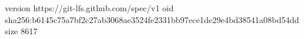 version https://git-lfs.github.com/spec/v1
oid sha256:b6145c75a7bf2c27ab3068ae3524fe2331bb97ece1de29e4bd38541a08bd54dd
size 8617

